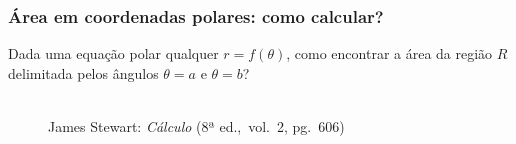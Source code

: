 \documentclass[pdftex, brazil, aspectratio=169]{beamer}
\begin{document}
\begin{frame}[t]
  \frametitle{Área em coordenadas polares: como calcular?}
  Dada uma equação polar qualquer $r = f(\theta)$, como encontrar a
  área da região $R$ delimitada pelos ângulos $\theta = a$ e $\theta = b$?
  \begin{figure}[H]
    \begin{center}
      \label{fig:int1-26}
      \\
      \footnotesize{James Stewart: \emph{Cálculo} (8ª ed.,\ vol.\ 2, pg.\ 606)}
    \end{center}
  \end{figure}
\end{frame}
\end{document}
